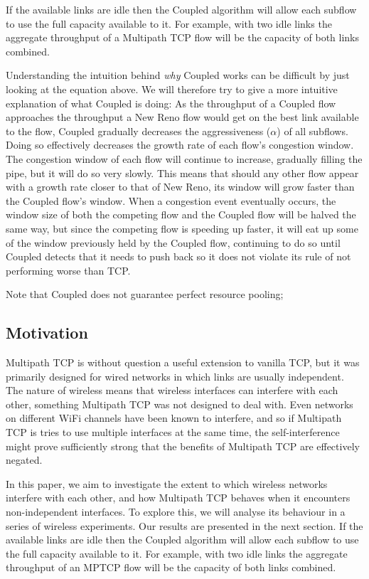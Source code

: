 If the available links are idle then the Coupled algorithm will allow each
subflow to use the full capacity available to it. For example, with two idle
links the aggregate throughput of a Multipath TCP flow will be the capacity of
both links combined.

Understanding the intuition behind \textit{why} Coupled works can be difficult
by just looking at the equation above. We will therefore try to give a more
intuitive explanation of what Coupled is doing: As the throughput of a Coupled
flow approaches the throughput a New Reno flow would get on the best link
available to the flow, Coupled gradually decreases the aggressiveness ($\alpha$)
of all subflows. Doing so effectively decreases the growth rate of each flow's
congestion window. The congestion window of each flow will continue to increase,
gradually filling the pipe, but it will do so very slowly. This means that
should any other flow appear with a growth rate closer to that of New Reno, its
window will grow faster than the Coupled flow's window. When a congestion event
eventually occurs, the window size of both the competing flow and the Coupled
flow will be halved the same way, but since the competing flow is speeding up
faster, it will eat up some of the window previously held by the Coupled flow,
continuing to do so until Coupled detects that it needs to push back so it
does not violate its rule of not performing worse than TCP.

Note that Coupled does not guarantee perfect resource pooling;

\subsection{Motivation}
\label{sec:bg:motivation}
Multipath TCP is without question a useful extension to vanilla TCP, but it was
primarily designed for wired networks in which links are usually independent.
The nature of wireless means that wireless interfaces can interfere with each
other, something Multipath TCP was not designed to deal with. Even networks on
different WiFi channels have been known to interfere, and so if Multipath TCP is
tries to use multiple interfaces at the same time, the self-interference might
prove sufficiently strong that the benefits of Multipath TCP are effectively
negated.

In this paper, we aim to investigate the extent to which wireless networks
interfere with each other, and how Multipath TCP behaves when it encounters
non-independent interfaces. To explore this, we will analyse its behaviour in a
series of wireless experiments. Our results are presented in the next section.
If the available links are idle then the Coupled algorithm will allow each
subflow to use the full capacity available to it. For example, with two idle
links the aggregate throughput of an MPTCP flow will be the capacity of both
links combined.
